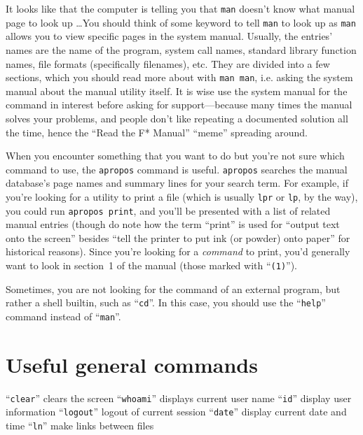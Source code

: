 \documentclass{extbook}
\begin{document}
It looks like that the computer is telling you that \verb|man| doesn't know what manual page to look up \ldots You should think of some keyword to tell \verb|man| to look up as \verb|man| allows you to view specific pages in the system manual. Usually, the entries' names are the name of the program, system call names, standard library function names, file formats (specifically filenames), etc. They are divided into a few sections, which you should read more about with \verb|man man|, i.e. asking the system manual about the manual utility itself. It is wise use the system manual for the command in interest before asking for support---because many times the manual solves your problems, and people don't like repeating a documented solution all the time, hence the ``Read the F* Manual'' ``meme'' spreading around.

When you encounter something that you want to do but you're not sure which command to use, the \verb|apropos| command is useful. \verb|apropos| searches the manual database's page names and summary lines for your search term. For example, if you're looking for a utility to print a file (which is usually \verb|lpr| or \verb|lp|, by the way), you could run \verb|apropos print|, and you'll be presented with a list of related manual entries (though do note how the term ``print'' is used for ``output text onto the screen'' besides ``tell the printer to put ink (or powder) onto paper'' for historical reasons). Since you're looking for a \emph{command} to print, you'd generally want to look in section~1 of the manual (those marked with ``\verb|(1)|'').

Sometimes, you are not looking for the command of an external program, but rather a shell builtin, such as ``\verb|cd|''. In this case, you should use the ``\verb|help|'' command instead of ``\verb|man|''.


\section{Useful general commands}
``\verb|clear|'' clears the screen
``\verb|whoami|'' displays current user name
``\verb|id|''  display user information
``\verb|logout|'' logout of current session
``\verb|date|'' display current date and time
``\verb|ln|'' make links between files
\end{document}
